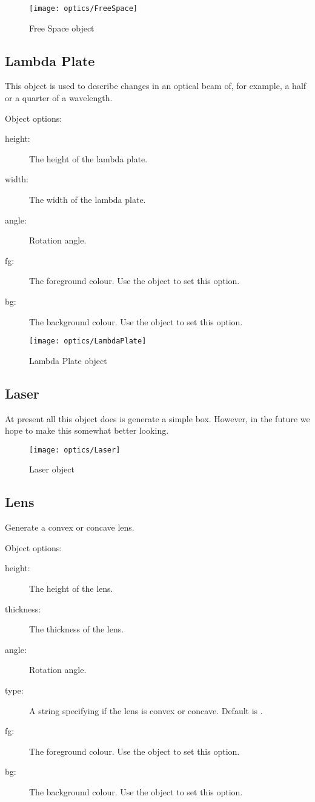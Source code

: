 \begin{figure}[ht]
\centerline{\texttt{[image: optics/FreeSpace]}}
\caption{Free Space object}
\label{fig:free_space}
\end{figure}

\subsection{Lambda Plate}

This object is used to describe changes in an optical beam of, for example,
a half or a quarter of a wavelength.

Object options:
\begin{description}
\item[height:] The height of the lambda plate.
\item[width:] The width of the lambda plate.
\item[angle:] Rotation angle.
\item[fg:] The foreground colour.  Use the  object to set this
option.
\item[bg:] The background colour.  Use the  object to set this
option.
\end{description}

\begin{figure}[ht]
\centerline{\texttt{[image: optics/LambdaPlate]}}
\caption{Lambda Plate object}
\label{fig:lambda_plate}
\end{figure}

\subsection{Laser}

At present all this object does is generate a simple box.  However, in the
future we hope to make this somewhat better looking.

\begin{figure}[ht]
\centerline{\texttt{[image: optics/Laser]}}
\caption{Laser object}
\label{fig:laser}
\end{figure}

\subsection{Lens}

Generate a convex or concave lens.

Object options:
\begin{description}
\item[height:] The height of the lens.
\item[thickness:] The thickness of the lens.
\item[angle:] Rotation angle.
\item[type:] A string specifying if the lens is convex or concave.  Default
is .
\item[fg:] The foreground colour.  Use the  object to set this
option.
\item[bg:] The background colour.  Use the  object to set this
option.
\end{description}

